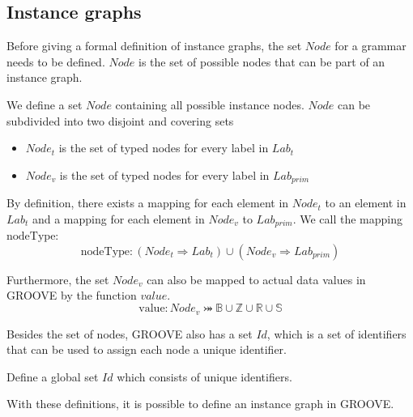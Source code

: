 \subsection{Instance graphs}
\label{subsec:formalisations:groove_formalisation:instance_graphs}
Before giving a formal definition of instance graphs, the set $Node$ for a grammar needs to be defined. $Node$ is the set of possible nodes that can be part of an instance graph.

\begin{defin}[Node]
\label{defin:formalisations:groove_formalisation:instance_graphs:node}
We define a set $Node$ containing all possible instance nodes. $Node$ can be subdivided into two disjoint and covering sets
\begin{itemize}
    \item $Node_t$ is the set of typed nodes for every label in $Lab_t$
    \item $Node_v$ is the set of typed nodes for every label in $Lab_{prim}$
\end{itemize}

By definition, there exists a mapping for each element in $Node_t$ to an element in $Lab_t$ and a mapping for each element in $Node_v$ to $Lab_{prim}$. We call the mapping $\mathrm{nodeType}$:
\begin{equation*}
    \mathrm{nodeType}: (Node_t \Rightarrow Lab_t) \cup (Node_v \Rightarrow Lab_{prim})
\end{equation*}

Furthermore, the set $Node_v$ can also be mapped to actual data values in GROOVE by the function $value$.
\begin{equation*}
    \mathrm{value}: Node_v \bij \mathbb{B} \cup \mathbb{Z} \cup \mathbb{R} \cup \mathbb{S}
\end{equation*}

\end{defin}

Besides the set of nodes, GROOVE also has a set $Id$, which is a set of identifiers that can be used to assign each node a unique identifier.

\begin{defin}[Identifiers]
\label{defin:formalisations:groove_formalisation:instance_graphs:identifiers}
Define a global set $Id$ which consists of unique identifiers.
\end{defin}

With these definitions, it is possible to define an instance graph in GROOVE.

